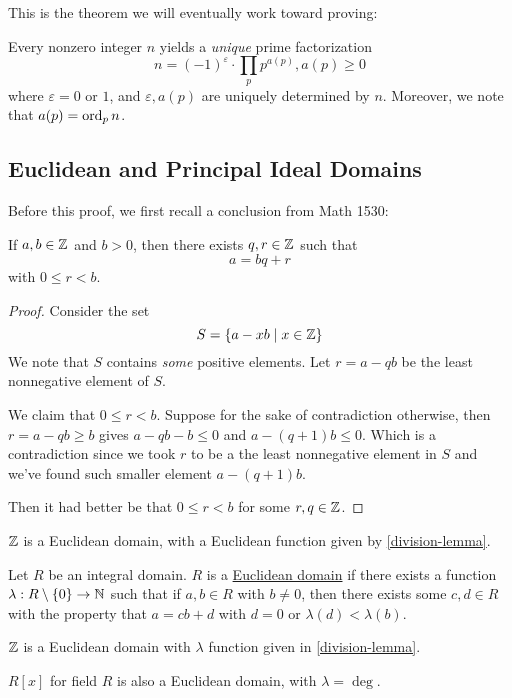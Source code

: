 This is the theorem we will eventually work toward proving:

\begin{theorem}\label{thm:unique-factorization}
    Every nonzero integer $n$ yields a \emph{unique} prime factorization
    \begin{equation*}
        n = (-1)^\varepsilon\cdot \prod_{p}p^{a(p)}, a(p)\geq 0
    \end{equation*}
    where $\varepsilon = 0$ or $1$, and $\varepsilon, a(p)$ are uniquely determined by $n$. Moreover, we note that $a(p) = \operatorname{ord}_p n$.
\end{theorem}

\subsection{Euclidean and Principal Ideal Domains}
Before this proof, we first recall a conclusion from Math 1530:
\begin{lemma}\label{division-lemma}
    If $a, b\in \mathbb Z$ and $b>0$, then there exists $q, r\in \mathbb Z$ such that
    \[a = bq + r\]
    with $0\leq r < b$.
\end{lemma}
\begin{proof}
    Consider the set
    \[S = \{a - xb \mid x\in \mathbb Z\}\]
    We note that $S$ contains \emph{some} positive elements. Let $r = a - qb$ be the least nonnegative element of $S$.

    We claim that $0\leq r < b$. Suppose for the sake of contradiction otherwise, then $r = a - qb \geq b$ gives $a - qb - b \leq 0$ and $a - (q+1)b\leq 0$. Which is a contradiction since we took $r$ to be a the least nonnegative element in $S$ and we've found such smaller element $a - (q+1)b$.

    Then it had better be that $0\leq r < b$ for some $r, q\in\mathbb Z$.
\end{proof}
\begin{corollary}\label{cor:z-euclidean}
    $\mathbb Z$ is a Euclidean domain, with a Euclidean function given by \cref{division-lemma}.
\end{corollary}

\begin{definition}
    Let $R$ be an integral domain. $R$ is a \ul{Euclidean domain} if there exists a function $\lambda: R\setminus \{0\} \to \mathbb N$ such that if $a, b\in R$ with $b\neq 0$, then there exists some $c, d\in R$ with the property that $a = cb + d$ with $d=0$ or $\lambda(d) < \lambda(b)$.
\end{definition}
\begin{example}
    $\mathbb Z$ is a Euclidean domain with $\lambda$ function given in \cref{division-lemma}.

    $R[x]$ for field $R$ is also a Euclidean domain, with $\lambda = \deg$.

\end{example}

